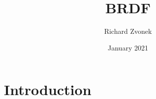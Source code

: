 \documentclass{article}
\title{BRDF}
\author{Richard Zvonek}
\date{January 2021}
\begin{document}
\maketitle

\section{Introduction}
\end{document}
